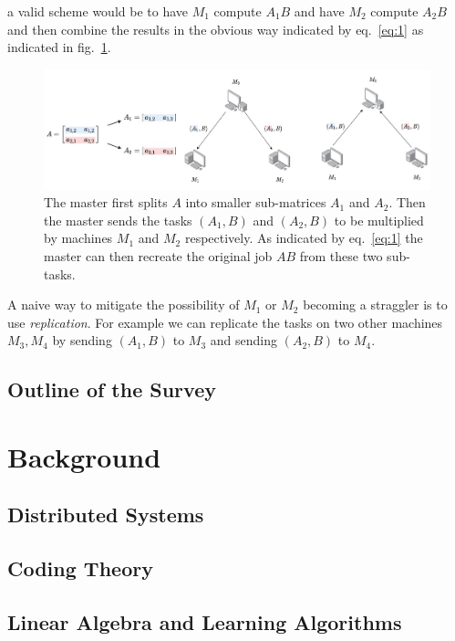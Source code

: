 \documentclass{report}
\begin{document}
a valid scheme would be to have $M_1$ compute $A_1 B$ and have $M_2$ compute $A_2 B$ and then combine the results in the obvious way indicated by eq.~\eqref{eq:1} as indicated in fig.~\ref{fig:2}. 
\begin{figure}
    \centering
    \includegraphics[width=\textwidth]{dist_diag_1.jpg}
    \caption{The master first splits $A$ into smaller sub-matrices $A_1$ and $A_2$. Then the master sends the tasks $(A_1,B)$ and $(A_2,B)$ to be multiplied by machines $M_1$ and $M_2$ respectively. As indicated by eq.~\eqref{eq:1} the master can then recreate the original job $AB$ from these two sub-tasks.}
    \label{fig:2}
\end{figure}

A naive way to mitigate the possibility of $M_1$ or $M_2$ becoming a straggler is to use \textit{replication}. For example we can replicate the tasks on two other machines $M_3,M_4$ by sending $(A_1,B)$ to $M_3$ and sending $(A_2,B)$ to $M_4$. 

\section{Outline of the Survey}

\chapter{Background}

\section{Distributed Systems}

\section{Coding Theory}


\section{Linear Algebra and Learning Algorithms}
\end{document}
